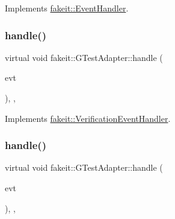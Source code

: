 Implements \mbox{\hyperlink{structfakeit_1_1EventHandler_a4de5ad05e5de73e36f4b2cede6d8efd3}{fakeit\+::\+Event\+Handler}}.

\mbox{\label{structfakeit_1_1GTestAdapter_ae97137644f1ec31fbd146a901ea81557}} 
\subsubsection{\texorpdfstring{handle()}{handle()}\hspace{0.1cm}{\footnotesize\ttfamily [2/6]}}
{\footnotesize\ttfamily virtual void fakeit\+::\+G\+Test\+Adapter\+::handle (\begin{DoxyParamCaption}\item[{const \mbox{\hyperlink{structfakeit_1_1SequenceVerificationEvent}{Sequence\+Verification\+Event}} \&}]{evt }\end{DoxyParamCaption})\hspace{0.3cm}{\ttfamily [inline]}, {\ttfamily [override]}, {\ttfamily [virtual]}}



Implements \mbox{\hyperlink{structfakeit_1_1VerificationEventHandler_adf355a9888bc2bf78ce0e1219bfb1379}{fakeit\+::\+Verification\+Event\+Handler}}.

\mbox{\label{structfakeit_1_1GTestAdapter_af19fbc5b4c9dc6b9c6a8f94eb2b7e322}} 
\subsubsection{\texorpdfstring{handle()}{handle()}\hspace{0.1cm}{\footnotesize\ttfamily [3/6]}}
{\footnotesize\ttfamily virtual void fakeit\+::\+G\+Test\+Adapter\+::handle (\begin{DoxyParamCaption}\item[{const \mbox{\hyperlink{structfakeit_1_1NoMoreInvocationsVerificationEvent}{No\+More\+Invocations\+Verification\+Event}} \&}]{evt }\end{DoxyParamCaption})\hspace{0.3cm}{\ttfamily [inline]}, {\ttfamily [override]}, {\ttfamily [virtual]}}



